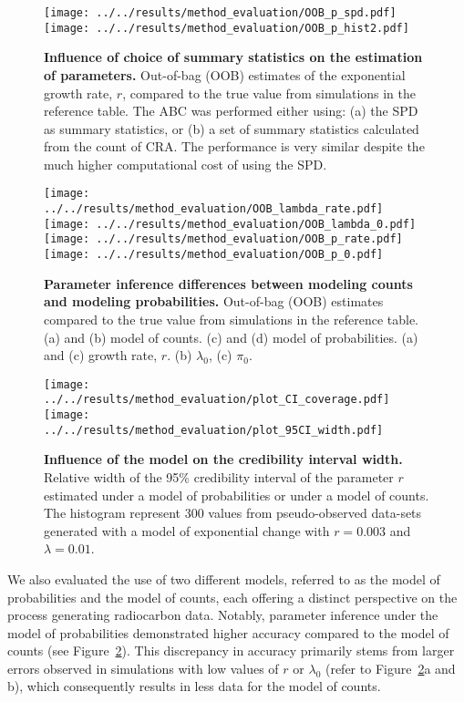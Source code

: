 \documentclass[a4paper]{article}
\begin{document}
\begin{figure}[tbh]
\center\texttt{[image: ../../results/method\_evaluation/OOB\_p\_spd.pdf]} \texttt{[image: ../../results/method\_evaluation/OOB\_p\_hist2.pdf]}
\caption[]{\textbf{Influence of choice of summary statistics on the estimation of parameters.} Out-of-bag (OOB) estimates of the exponential growth rate, $r$, compared to the true value from simulations in the reference table. The ABC was performed either using: (a) the SPD as summary statistics, or (b) a set of summary statistics calculated from the count of CRA. The performance is very similar despite the much higher computational cost of using the SPD.}
\label{fig:summary_stats}
\end{figure}




\begin{figure}[tbh]
\center\texttt{[image: ../../results/method\_evaluation/OOB\_lambda\_rate.pdf]} \texttt{[image: ../../results/method\_evaluation/OOB\_lambda\_0.pdf]} \texttt{[image: ../../results/method\_evaluation/OOB\_p\_rate.pdf]}
\texttt{[image: ../../results/method\_evaluation/OOB\_p\_0.pdf]}
\caption{\textbf{Parameter inference differences between modeling counts  and modeling probabilities.} Out-of-bag (OOB) estimates compared to the true value from simulations in the reference table. (a) and (b) model of counts. (c) and (d) model of probabilities. (a) and (c)  growth rate, $r$. (b) $\lambda_0$, (c) $\pi_0$.}
\label{fig:freq_vs_counts}
\end{figure}


\begin{figure}[tbh]
\center\texttt{[image: ../../results/method\_evaluation/plot\_CI\_coverage.pdf]}\texttt{[image: ../../results/method\_evaluation/plot\_95CI\_width.pdf]}
\caption{\textbf{Influence of the model on the credibility interval width.} Relative width of the 95\% credibility interval of the parameter $r$ estimated under a model of probabilities or under a model of counts. The histogram represent 300 values from pseudo-observed data-sets generated with a model of exponential change with $r=0.003$ and $\lambda=0.01$.}
\label{fig:95CIwidth}
\end{figure}


We also evaluated the use of two different models, referred to as the model of probabilities and the model of counts, each offering a distinct perspective on the process generating radiocarbon data. Notably, parameter inference under the model of probabilities demonstrated higher accuracy compared to the model of counts (see Figure~\ref{fig:freq_vs_counts}). This discrepancy in accuracy primarily stems from larger errors observed in simulations with low values of $r$ or $\lambda_0$ (refer to Figure~\ref{fig:freq_vs_counts}a and b), which consequently results in less data for the model of counts.
\\
\end{document}
